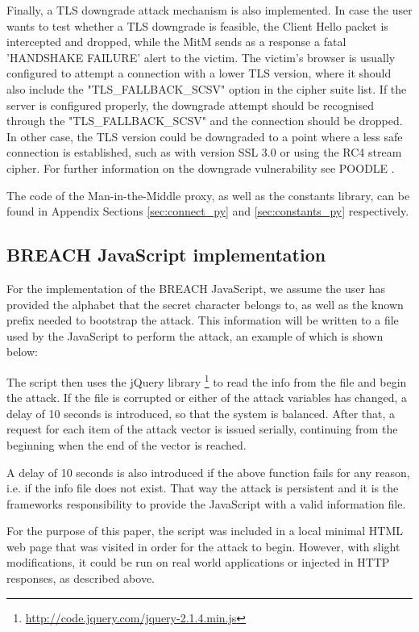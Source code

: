 Finally, a TLS downgrade attack mechanism is also implemented. In case the user
wants to test whether a TLS downgrade is feasible, the Client Hello packet is
intercepted and dropped, while the MitM sends as a response a fatal 'HANDSHAKE
FAILURE' alert to the victim. The victim's browser is usually configured to
attempt a connection with a lower TLS version, where it should also include the
"TLS\_FALLBACK\_SCSV" option in the cipher suite list. If the server is
configured properly, the downgrade attempt should be recognised through the
"TLS\_FALLBACK\_SCSV" and the connection should be dropped. In other case, the
TLS version could be downgraded to a point where a less safe connection is
established, such as with version SSL 3.0 or using the RC4 stream cipher. For
further information on the downgrade vulnerability see POODLE \cite{poodle}.

The code of the Man-in-the-Middle proxy, as well as the constants library, can
be found in Appendix Sections \ref{sec:connect_py} and \ref{sec:constants_py}
respectively.

\subsection{BREACH JavaScript implementation}

For the implementation of the BREACH JavaScript, we assume the user has provided
the alphabet that the secret character belongs to, as well as the known prefix
needed to bootstrap the attack. This information will be written to a file used
by the JavaScript to perform the attack, an example of which is shown below:


The script then uses the jQuery library
\footnote{\url{http://code.jquery.com/jquery-2.1.4.min.js}} to read the info
from the file and begin the attack. If the file is corrupted or either of the
attack variables has changed, a delay of 10 seconds is introduced, so that the
system is balanced. After that, a request for each item of the attack vector is
issued serially, continuing from the beginning when the end of the vector is
reached.

A delay of 10 seconds is also introduced if the above function fails for any
reason, i.e. if the info file does not exist. That way the attack is persistent
and it is the frameworks responsibility to provide the JavaScript with a valid
information file.

For the purpose of this paper, the script was included in a local minimal HTML
web page that was visited in order for the attack to begin. However, with slight
modifications, it could be run on real world applications or injected in HTTP
responses, as described above.

